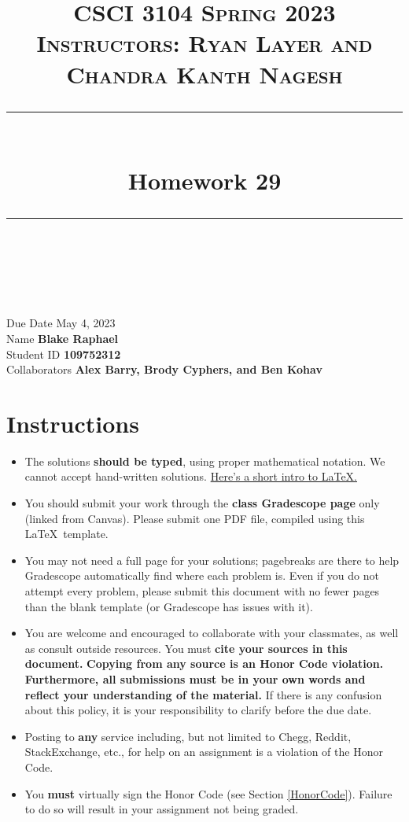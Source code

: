 \documentclass[11pt]{article}
\title{
\normalfont \normalsize
\textsc{CSCI 3104 Spring 2023 \\
Instructors: Ryan Layer and Chandra Kanth Nagesh} \\
[10pt]
\rule{\linewidth}{0.5pt} \\[6pt]
\huge Homework 29 \\
\rule{\linewidth}{2pt}  \\[10pt]
}
\author{}
\date{}
\theoremstyle{definition}
\theoremstyle{definition}
\theoremstyle{definition}
\begin{document}

\maketitle


\noindent
Due Date \dotfill May 4, 2023 \\
Name \dotfill \textbf{Blake Raphael} \\
Student ID \dotfill \textbf{109752312} \\
Collaborators \dotfill \textbf{Alex Barry, Brody Cyphers, and Ben Kohav}

\tableofcontents

\section{Instructions}
 \begin{itemize}
	\item The solutions \textbf{should be typed}, using proper mathematical notation. We cannot accept hand-written solutions. \href{http://ece.uprm.edu/~caceros/latex/introduction.pdf}{Here's a short intro to \LaTeX.}
	\item You should submit your work through the \textbf{class Gradescope page} only (linked from Canvas). Please submit one PDF file, compiled using this \LaTeX \ template.
	\item You may not need a full page for your solutions; pagebreaks are there to help Gradescope automatically find where each problem is. Even if you do not attempt every problem, please submit this document with no fewer pages than the blank template (or Gradescope has issues with it).

	\item You are welcome and encouraged to collaborate with your classmates, as well as consult outside resources. You must \textbf{cite your sources in this document.} \textbf{Copying from any source is an Honor Code violation. Furthermore, all submissions must be in your own words and reflect your understanding of the material.} If there is any confusion about this policy, it is your responsibility to clarify before the due date. 

	\item Posting to \textbf{any} service including, but not limited to Chegg, Reddit, StackExchange, etc., for help on an assignment is a violation of the Honor Code.

	\item You \textbf{must} virtually sign the Honor Code (see Section \ref{HonorCode}). Failure to do so will result in your assignment not being graded.
\end{itemize}
\end{document}
